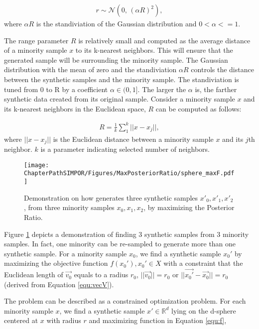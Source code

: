 \begin{align}
     r \sim \mathcal{N}(0,\,(\alpha R)^{2}),
     \label{equ:r_dist}
\end{align}
where $\alpha R$ is the standiviation of the Gaussian distribution and $ 0< \alpha <=1 $.

The range parameter $R$ is relatively small and computed as the average distance of a minority sample $x$ to its k-nearest neighbors. This will ensure that the generated sample will be surrounding the minority sample. The Gaussian distribution with the mean of zero and the standiviation $\alpha R$ controls the distance between the synthetic samples and the minority sample. The standiviation is tuned from 0 to R by a coefficient $\alpha \in (0,1]$. The larger the $\alpha$ is, the farther synthetic data created from its original sample. Consider a minority sample $x$ and its k-nearest neighbors in the Euclidean space, $R$ can be computed as follows:

\begin{align}
	R = \frac{1}{k}\sum\limits_{1}^{k} ||x-x_j ||,
\end{align}
where $||x-x_j||$ is the Euclidean distance between a minority sample $x$ and its $j$th neighbor. $k$ is a parameter indicating selected number of neighbors. 

\begin{figure}[th!]
	\texttt{[image: \\ChapterPathSIMPOR/Figures/MaxPosteriorRatio/sphere\_maxF.pdf]}
	\caption[Demonstration of synthetic sample generation.]{Demonstration on how \Methodname{} generates three synthetic samples $x'_0, x'_1, x'_2$, from three minority samples $x_0, x_1, x_2$, by maximizing the Posterior Ratio. }
	\label{fig:sphere_maxF}
\end{figure}

Figure \ref{fig:sphere_maxF} depicts a demonstration of finding 3 synthetic samples from 3 minority samples. In fact, one minority can be re-sampled to generate more than one synthetic sample. For a minority sample $x_0$, we find a synthetic sample $x_0'$ by maximizing the objective function $f(x_0'), x_0' \in X$ with a constraint that the Euclidean length of $\vec{v_0}$ equals to a radius $r_0$, $||\vec{v_0}|| = r_0$ or $||\vec{x_0'}-\vec{x_0}||=r_0$ (derived from Equation \ref{equ:vecV}). 


The problem can be described as a constrained optimization problem. For each minority sample $x$, we find a synthetic sample $x'\in \mathbb{R}^d$ lying on the d-sphere centered at $x$ with radius $r$ and maximizing function in Equation \ref{equ:f},


